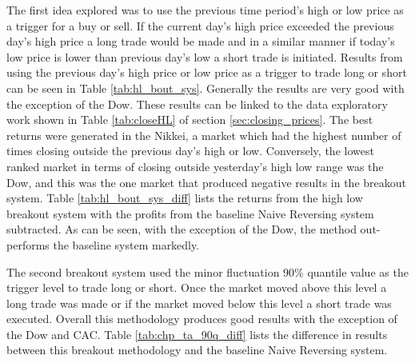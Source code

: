 The first idea explored was to use the previous time period's high or low price as a trigger for a buy or sell. If the current day's high price exceeded the previous day's high price a long trade would be made and in a similar manner if today's low price is lower than previous day's low a short trade is initiated. Results from using the previous day's high price or low price as a trigger to trade long or short can be seen in Table \ref{tab:hl_bout_sys}. Generally the results are very good with the exception of the Dow. These results can be linked to the data exploratory work shown in Table \ref{tab:closeHL} of section \ref{sec:closing_prices}. The best returns were generated in the Nikkei, a market which had the highest number of times closing outside the previous day's high or low. Conversely, the lowest ranked market in terms of closing outside yesterday's high low range was the Dow, and this was the one market that produced negative results in the breakout system. Table \ref{tab:hl_bout_sys_diff} lists the returns from the high low breakout system with the profits from the baseline Naive Reversing system subtracted. As can be seen, with the exception of the Dow, the method out-performs the baseline system markedly.



The second breakout system used the minor fluctuation 90\% quantile value as the trigger level to trade long or short. Once the market moved above this level a long trade was made or if the market moved below this level a short trade was executed. Overall this methodology produces good results with the exception of the Dow and CAC. Table \ref{tab:chp_ta_90q_diff} lists the difference in results between this breakout methodology and the baseline Naive Reversing system.



